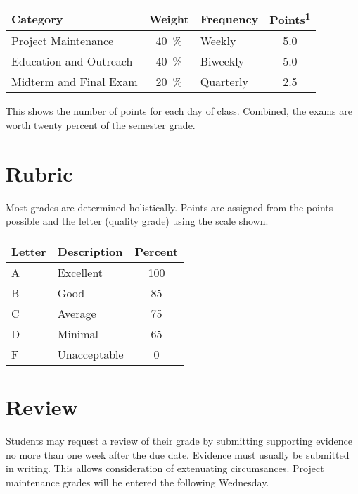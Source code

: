 \documentclass[letterpaper,10pt]{memoir}
\begin{document}
	\vspace*{5mm}
	\begin{center}
	{%
		\renewcommand{\arraystretch}{1.35}
		\noindent
		\begin{tabular}{ l c l S }
		Category						&	Weight	&	Frequency	&	{Points\textsuperscript{1}}	\\
		\midrule
		Project Maintenance		&	\SI{40}{\percent} &	Weekly		&	\num{5.0}	\\
		Education and Outreach	&	\SI{40}{\percent}	&	Biweekly 	&	\num{5.0}	\\
		Midterm and Final Exam	&	\SI{20}{\percent}	&	Quarterly	&	\num{2.5}	\\
		\end{tabular}
	}
	\end{center}
	\vspace*{5mm}
	
	\noindent
	This shows the number of points for each day of class.
	Combined, the exams are worth twenty percent of the semester grade.
	
	
	
	\vspace*{5mm}

\noindent


\section*{Rubric}

Most grades are determined holistically.
%
Points are assigned from the points possible and the letter (quality grade) using the scale shown.

	\begin{center}
	{%
	\renewcommand{\arraystretch}{1.5}
	\begin{tabular}{ l l c }
		Letter & Description	&	Percent	\\
		\midrule
		A & Excellent		&	100	\\
		B & Good				&   85	\\
		C & Average			&   75	\\
		D & Minimal			&   65	\\
		F & Unacceptable	&    0	\\
	\end{tabular}
	}%
	\end{center}


\section*{Review}
Students may request a review of their grade by submitting supporting evidence no more than one week after the due date. Evidence must usually be submitted in writing. This allows consideration of extenuating circumsances. Project maintenance grades will be entered the following Wednesday.
\end{document}
